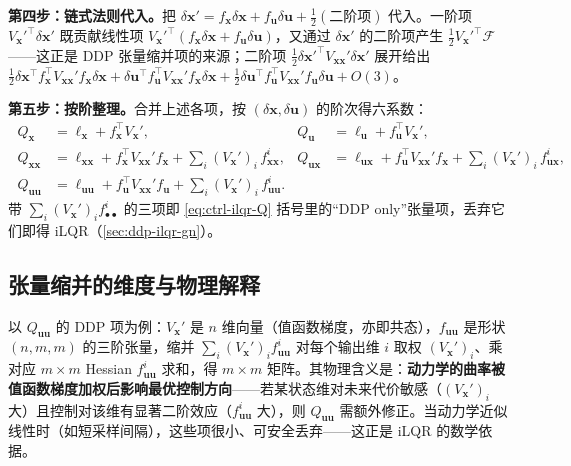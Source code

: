 \textbf{第四步：链式法则代入。}\;把 $\delta\mathbf{x}'=f_{\mathbf{x}}\delta\mathbf{x}+f_{\mathbf{u}}\delta\mathbf{u}+\tfrac12(\text{二阶项})$ 代入。一阶项 $V_{\mathbf{x}}'^{\top}\delta\mathbf{x}'$ 既贡献线性项 $V_{\mathbf{x}}'^{\top}(f_{\mathbf{x}}\delta\mathbf{x}+f_{\mathbf{u}}\delta\mathbf{u})$，又通过 $\delta\mathbf{x}'$ 的二阶项产生 $\tfrac12 V_{\mathbf{x}}'^{\top}\mathcal{F}$——这正是 DDP 张量缩并项的来源；二阶项 $\tfrac12\delta\mathbf{x}'^{\top}V_{\mathbf{xx}}'\delta\mathbf{x}'$ 展开给出 $\tfrac12\delta\mathbf{x}^\top f_{\mathbf{x}}^\top V_{\mathbf{xx}}'f_{\mathbf{x}}\delta\mathbf{x}+\delta\mathbf{u}^\top f_{\mathbf{u}}^\top V_{\mathbf{xx}}'f_{\mathbf{x}}\delta\mathbf{x}+\tfrac12\delta\mathbf{u}^\top f_{\mathbf{u}}^\top V_{\mathbf{xx}}'f_{\mathbf{u}}\delta\mathbf{u}+O(3)$。

\textbf{第五步：按阶整理。}\;合并上述各项，按 $(\delta\mathbf{x},\delta\mathbf{u})$ 的阶次得六系数：
\begin{equation}
  \boxed{\;
  \begin{aligned}
    Q_{\mathbf{x}}&=\ell_{\mathbf{x}}+f_{\mathbf{x}}^\top V_{\mathbf{x}}', &
    Q_{\mathbf{u}}&=\ell_{\mathbf{u}}+f_{\mathbf{u}}^\top V_{\mathbf{x}}', \\
    Q_{\mathbf{xx}}&=\ell_{\mathbf{xx}}+f_{\mathbf{x}}^\top V_{\mathbf{xx}}'f_{\mathbf{x}}+\textstyle\sum_{i}(V_{\mathbf{x}}')_i\,f^i_{\mathbf{xx}}, &
    Q_{\mathbf{ux}}&=\ell_{\mathbf{ux}}+f_{\mathbf{u}}^\top V_{\mathbf{xx}}'f_{\mathbf{x}}+\textstyle\sum_{i}(V_{\mathbf{x}}')_i\,f^i_{\mathbf{ux}}, \\
    Q_{\mathbf{uu}}&=\ell_{\mathbf{uu}}+f_{\mathbf{u}}^\top V_{\mathbf{xx}}'f_{\mathbf{u}}+\textstyle\sum_{i}(V_{\mathbf{x}}')_i\,f^i_{\mathbf{uu}}. &&
  \end{aligned}\;}
  \label{eq:ddp-Q6}
\end{equation}
带 $\sum_i(V_{\mathbf{x}}')_i f^i_{\bullet\bullet}$ 的三项即 \cref{eq:ctrl-ilqr-Q} 括号里的“DDP only”张量项，丢弃它们即得 iLQR（\cref{sec:ddp-ilqr-gn}）。

\subsection{张量缩并的维度与物理解释}
\label{sec:ddp-tensor}

以 $Q_{\mathbf{uu}}$ 的 DDP 项为例：$V_{\mathbf{x}}'$ 是 $n$ 维向量（值函数梯度，亦即共态），$f_{\mathbf{uu}}$ 是形状 $(n,m,m)$ 的三阶张量，缩并 $\sum_i(V_{\mathbf{x}}')_i f^i_{\mathbf{uu}}$ 对每个输出维 $i$ 取权 $(V_{\mathbf{x}}')_i$、乘对应 $m\times m$ Hessian $f^i_{\mathbf{uu}}$ 求和，得 $m\times m$ 矩阵。其物理含义是：\textbf{动力学的曲率被值函数梯度加权后影响最优控制方向}——若某状态维对未来代价敏感（$(V_{\mathbf{x}}')_i$ 大）且控制对该维有显著二阶效应（$f^i_{\mathbf{uu}}$ 大），则 $Q_{\mathbf{uu}}$ 需额外修正。当动力学近似线性时（如短采样间隔），这些项很小、可安全丢弃——这正是 iLQR 的数学依据。

